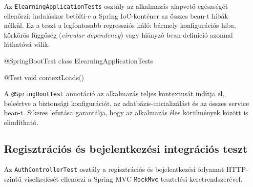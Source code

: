 Az \texttt{ElearningApplicationTests} osztály az alkalmazás alapvető egészségét ellenőrzi: induláskor betölti-e a Spring IoC-konténer az összes bean-t hibák nélkül. Ez a teszt a legfontosabb regressziós háló: bármely konfigurációs hiba, körkörös függőség (\textit{circular dependency}) vagy hiányzó bean-definíció azonnal láthatóvá válik.

\begin{java}[caption={Spring kontextus betöltési teszt},label=java:contexttest]
@SpringBootTest
class ElearningApplicationTests {

    @Test
    void contextLoads() {
    }
}
\end{java}

A \texttt{@SpringBootTest} annotáció az alkalmazás teljes kontextusát indítja el, beleértve a biztonsági konfigurációt, az adatbázis-inicializálást és az összes service bean-t. Sikeres lefutása garantálja, hogy az alkalmazás éles körülmények között is elindítható.

\subsection{Regisztrációs és bejelentkezési integrációs teszt}

Az \texttt{AuthControllerTest} osztály a regisztrációs és bejelentkezési folyamat HTTP-szintű viselkedését ellenőrzi a Spring MVC \texttt{MockMvc} tesztelési keretrendszerével.

